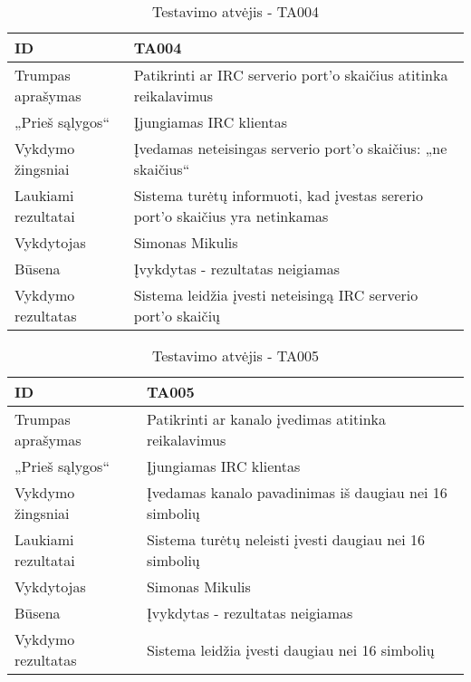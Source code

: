 \begin{table}[H]
  \centering
  \label{table:TA004}
  \begin{tabular}{|l|l|}
    \hline
    ID                  & TA004                                                                                 \\ \hline
    Trumpas aprašymas   & Patikrinti ar IRC serverio port'o skaičius atitinka reikalavimus                      \\ \hline
    „Prieš sąlygos“     & Įjungiamas IRC klientas                                                               \\ \hline
    Vykdymo žingsniai   & Įvedamas neteisingas serverio port'o skaičius: „ne skaičius“                          \\ \hline
    Laukiami rezultatai & Sistema turėtų informuoti, kad įvestas sererio port'o skaičius yra netinkamas         \\ \hline
    Vykdytojas          & Simonas Mikulis                                                                       \\ \hline
    Būsena              & Įvykdytas - rezultatas neigiamas                                                      \\ \hline
    Vykdymo rezultatas  & \cellcolor[HTML]{FF0000}Sistema leidžia įvesti neteisingą IRC serverio port'o skaičių \\ \hline
  \end{tabular}
  \caption{Testavimo atvėjis - TA004}
\end{table}

\begin{table}[H]
  \centering
  \label{table:TA005}
  \begin{tabular}{|l|l|}
    \hline
    ID                  & TA005                                                                  \\ \hline
    Trumpas aprašymas   & Patikrinti ar kanalo įvedimas atitinka reikalavimus                    \\ \hline
    „Prieš sąlygos“     & Įjungiamas IRC klientas                                                \\ \hline
    Vykdymo žingsniai   & Įvedamas kanalo pavadinimas iš daugiau nei 16 simbolių                 \\ \hline
    Laukiami rezultatai & Sistema turėtų neleisti įvesti daugiau nei 16 simbolių                 \\ \hline
    Vykdytojas          & Simonas Mikulis                                                        \\ \hline
    Būsena              & Įvykdytas - rezultatas neigiamas                                       \\ \hline
    Vykdymo rezultatas  & \cellcolor[HTML]{FF0000}Sistema leidžia įvesti daugiau nei 16 simbolių \\ \hline
  \end{tabular}
  \caption{Testavimo atvėjis - TA005}
\end{table}

